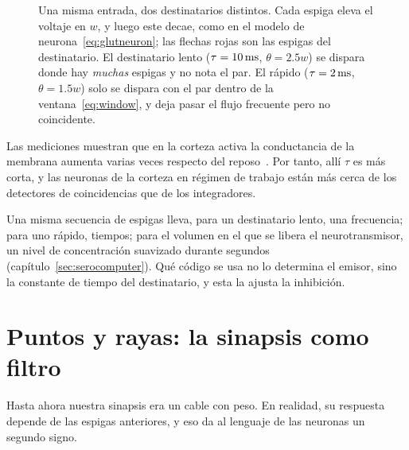 \begin{figure}[t]
\caption{Una misma entrada, dos destinatarios distintos. Cada espiga eleva el voltaje en $w$, y luego este decae, como en el modelo de neurona~\eqref{eq:glutneuron}; las flechas rojas son las espigas del destinatario. El destinatario lento ($\tau=10\,\text{ms}$, $\theta=2.5w$) se dispara donde hay \emph{muchas} espigas y no nota el par. El rápido ($\tau=2\,\text{ms}$, $\theta=1.5w$) solo se dispara con el par dentro de la ventana~\eqref{eq:window}, y deja pasar el flujo frecuente pero no coincidente.}
\label{fig:reader}
\end{figure}

Las mediciones muestran que en la corteza activa la conductancia de la membrana aumenta varias veces respecto del reposo~\cite{Destexhe2003}. Por tanto, allí $\tau$ es más corta, y las neuronas de la corteza en régimen de trabajo están más cerca de los detectores de coincidencias que de los integradores.

\begin{keyblock}
\begin{proposition}
\label{prop:reader}
Una misma secuencia de espigas lleva, para un destinatario lento, una frecuencia; para uno rápido, tiempos; para el volumen en el que se libera el neurotransmisor, un nivel de concentración suavizado durante segundos (capítulo~\ref{sec:serocomputer}). Qué código se usa no lo determina el emisor, sino la constante de tiempo del destinatario, y esta la ajusta la inhibición.
\end{proposition}
\end{keyblock}
\section{Puntos y rayas: la sinapsis como filtro}

Hasta ahora nuestra sinapsis era un cable con peso. En realidad, su respuesta depende de las espigas anteriores, y eso da al lenguaje de las neuronas un segundo signo.

